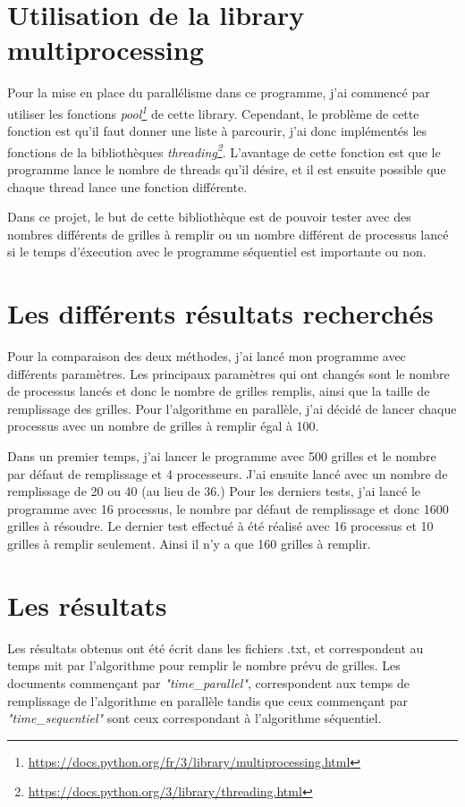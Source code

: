 \documentclass[12pt]{article}
\begin{document}
\newpage
\section{Utilisation de la library multiprocessing}
Pour la mise en place du parallélisme dans ce programme, j'ai commencé par utiliser les fonctions \textit{pool\footnote{\url{https://docs.python.org/fr/3/library/multiprocessing.html}}} de cette library. Cependant, le problème de cette fonction est qu'il faut donner une liste à parcourir, j'ai donc implémentés les fonctions de la bibliothèques \textit{threading\footnote{\url{https://docs.python.org/3/library/threading.html}}}. L'avantage de cette fonction est que le programme lance le nombre de threads qu'il désire, et il est ensuite possible que chaque thread lance une fonction différente.

Dans ce projet, le but de cette bibliothèque est de pouvoir tester avec des nombres différents de grilles à remplir ou un nombre différent de processus lancé si le temps d'éxecution avec le programme séquentiel est importante ou non.

\section{Les différents résultats recherchés}
Pour la comparaison des deux méthodes, j'ai lancé mon programme avec différents paramètres. Les principaux paramètres qui ont changés sont le nombre de processus lancés et donc le nombre de grilles remplis, ainsi que la taille de remplissage des grilles. Pour l'algorithme en parallèle, j'ai décidé de lancer chaque processus avec un nombre de grilles à remplir égal à 100.

Dans un premier temps, j'ai lancer le programme avec 500 grilles et le nombre par défaut de remplissage et 4 processeurs. J'ai ensuite lancé avec un nombre de remplissage de 20 ou 40 (au lieu de 36.) Pour les derniers tests, j'ai lancé le programme avec 16 processus, le nombre par défaut de remplissage et donc 1600 grilles à résoudre.
Le dernier test effectué à été réalisé avec 16 processus et 10 grilles à remplir seulement. Ainsi il n'y a que 160 grilles à remplir.


\section{Les résultats}
Les résultats obtenus ont été écrit dans les fichiers .txt, et correspondent au temps mit par l'algorithme pour remplir le nombre prévu de grilles. Les documents commençant par \textit{"time\_parallel"}, correspondent aux temps de remplissage de l'algorithme en parallèle tandis que ceux commençant par \textit{"time\_sequentiel"} sont ceux correspondant à l'algorithme séquentiel.
\end{document}
